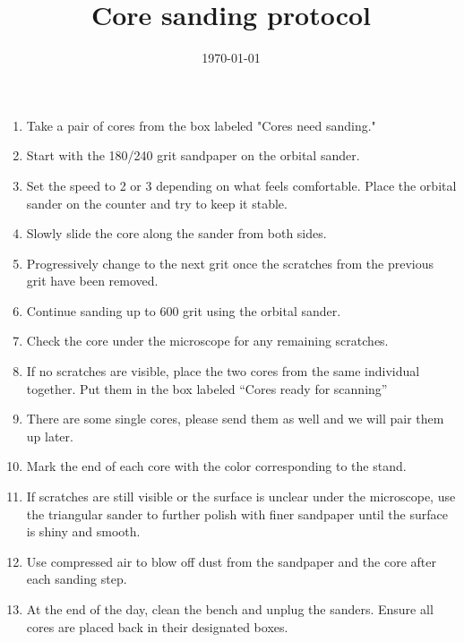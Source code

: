 \documentclass[11pt,letter]{article}
\begin{document}
\title{Core sanding protocol} 
\date{\today}
\maketitle

\setlength{\parindent}{0pt}
\setlength{\parskip}{3pt}
\begin{enumerate}
\item Take a pair of cores from the box labeled "Cores need sanding."
\item Start with the 180/240 grit sandpaper on the orbital sander.
\item Set the speed to 2 or 3 depending on what feels comfortable. Place the orbital sander on the counter and try to keep it stable.
\item Slowly slide the core along the sander from both sides.
\item Progressively change to the next grit once the scratches from the previous grit have been removed.
\item Continue sanding up to 600 grit using the orbital sander.
\item Check the core under the microscope for any remaining scratches.
\item If no scratches are visible, place the two cores from the same individual together. Put them in the box labeled ``Cores ready for scanning''
\item There are some single cores, please send them as well and we will pair them up later.
\item Mark the end of each core with the color corresponding to the stand.
\item If scratches are still visible or the surface is unclear under the microscope, use the triangular sander to further polish with finer sandpaper until the surface is shiny and smooth.
\item Use compressed air to blow off dust from the sandpaper and the core after each sanding step.
\item At the end of the day, clean the bench and unplug the sanders. Ensure all cores are placed back in their designated boxes.
	\end{enumerate}
\end{document}
